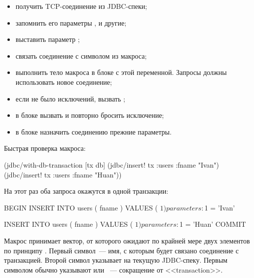 \begin{itemize}

\item
  получить TCP-соединение из JDBC-спеки;

\item
  запомнить его параметры ,  и другие;

\item
  выставить параметр ;

\item
  связать соединение с символом из макроса;

\item
  выполнить тело макроса в блоке  с этой переменной. Запросы должны использовать новое соединение;

\item
  если не было исключений, вызвать ;

\item
  в блоке  вызвать  и повторно бросить исключение;

\item
  в блоке  назначить соединению прежние параметры.

\end{itemize}

Быстрая проверка макроса:

\begin{english}
  \begin{clojure}
(jdbc/with-db-transaction [tx db]
  (jdbc/insert! tx :users {:fname "Ivan"})
  (jdbc/insert! tx :users {:fname "Huan"}))
  \end{clojure}
\end{english}

На этот раз оба запроса окажутся в одной транзакции:

\begin{english}
  \begin{sql}
BEGIN
INSERT INTO users ( fname ) VALUES ( $1 )
parameters: $1 = 'Ivan'

INSERT INTO users ( fname ) VALUES ( $1 )
parameters: $1 = 'Huan'
COMMIT
  \end{sql}
\end{english}

Макрос принимает вектор, от которого ожидают по крайней мере двух элементов по принципу . Первый символ~--- имя, с которым будет связано соединение с транзакцией. Второй символ указывает на текущую JDBC-спеку. Первым символом обычно указывают  или ~--- сокращение от <<transaction>>.

